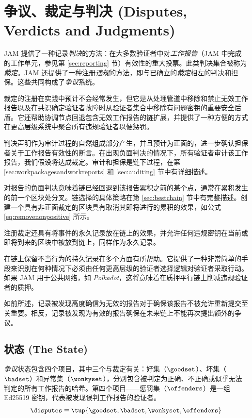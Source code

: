 \section{争议、裁定与判决 (Disputes, Verdicts and Judgments)}\label{sec:disputes}

JAM 提供了一种记录\emph{判决}的方法：在大多数验证者中对\emph{工作报告}（JAM 中完成的工作单元，参见第 \ref{sec:reporting} 节）有效性的重大投票。此类判决集合被称为\emph{裁定}。JAM 还提供了一种注册\emph{违规}的方法，即与已确立的\emph{裁定}相左的判决和担保。这些共同构成了\emph{争议}系统。

裁定的注册在实践中预计不会经常发生，但它是从处理管道中移除和禁止无效工作报告以及在共识确定验证者故障时从验证者集合中移除有问题密钥的重要安全后盾。它还帮助协调节点回退包含无效工作报告的链扩展，并提供了一种方便的方式在更高层级系统中聚合所有违规验证者以便惩罚。

判决声明作为审计过程的自然组成部分产生，并且预计为正面的，进一步确认担保者关于工作报告有效性的断言。在出现负面判决的情况下，所有验证者审计该工作报告，我们假设将达成裁定。审计和担保是链下过程，在第 \ref{sec:workpackagesandworkreports} 和 \ref{sec:auditing} 节中有详细描述。

对报告的负面判决意味着链已经回退到该报告累积之前的某个点，通常在累积发生的前一个区块处分叉。链选择的具体策略在第 \ref{sec:bestchain} 节中有完整描述。创建一个具有非正面裁定的区块具有取消其即将进行的累积的效果，如公式 \ref{eq:removenonpositive} 所示。

注册裁定还具有将事件的永久记录放在链上的效果，并允许任何违规密钥在当前或即将到来的区块中被放到链上，同样作为永久记录。

在链上保留不当行为的持久记录在多个方面有所帮助。它提供了一种非常简单的手段来识别在何种情况下必须由任何更高层级的验证者选择逻辑对验证者采取行动。如果 JAM 用于公共网络，如 \emph{Polkadot}，这将意味着在质押平行链上削减违规验证者的质押。

如前所述，记录被发现高度确信为无效的报告对于确保该报告不被允许重新提交至关重要。相反，记录被发现为有效的报告确保在未来链上不能再次提出额外的争议。

\subsection{状态 (The State)}

\emph{争议}状态包含四个项目，其中三个与裁定有关：好集（$\goodset$）、坏集（$\badset$）和异常集（$\wonkyset$），分别包含被判定为正确、不正确或似乎无法判定的所有工作报告的哈希。第四个项目——惩罚集（$\offenders$）是一组 Ed25519 密钥，代表被发现误判工作报告的验证者。
\begin{equation}\label{eq:disputesspec}
  \disputes \equiv \tup{\goodset, \badset, \wonkyset, \offenders}
\end{equation}

